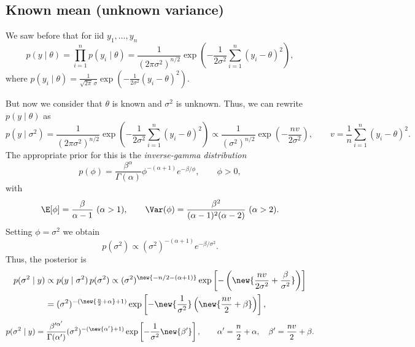 \subsection{Known mean (unknown variance)}
We saw before that for iid $y_1, \dots, y_n$
\[
p(y \mid \theta) = \prod_{i=1}^{n} p(y_i \mid \theta) = \frac{1}{(2\pi\sigma^2)^{n/2}}\exp\left(-\frac{1}{2\sigma^2}\sum_{i=1}^{n}(y_i - \theta)^2\right),
\]
where $p(y_i \mid \theta) = \frac{1}{\sqrt{2\pi}\,\sigma}\exp\left(-\frac{1}{2\sigma^2}(y_i - \theta)^2\right)$.

But now we consider that $\theta$ is known and $\sigma^2$ is unknown. Thus, we can rewrite $p(y \mid \theta)$ as
\[
p(y \mid \sigma^2) = \frac{1}{(2\pi\sigma^2)^{n/2}}\exp\left(-\frac{1}{2\sigma^2}\sum_{i=1}^{n}(y_i - \theta)^2\right)
\propto \frac{1}{(\sigma^2)^{n/2}}\exp\left(-\frac{nv}{2\sigma^2}\right),
\qquad
v = \frac1n\sum_{i=1}^{n}(y_i - \theta)^2.
\]
The appropriate prior for this is the \emph{inverse-gamma distribution}
\[
p(\phi) = \frac{\beta^\alpha}{\Gamma(\alpha)}\phi^{-(\alpha+1)}e^{-\beta/\phi}, \qquad \phi > 0,
\]
with
\[
\E[\phi] = \frac{\beta}{\alpha - 1}\ (\alpha > 1), \qquad \Var(\phi) = \frac{\beta^2}{(\alpha-1)^2(\alpha-2)}\ (\alpha > 2).
\]
Setting $\phi = \sigma^2$ we obtain
\[
p(\sigma^2) \propto (\sigma^2)^{-(\alpha+1)}e^{-\beta/\sigma^2}.
\]
Thus, the posterior is
\begin{align*}
p(\sigma^2 \mid y) &\propto p(y \mid \sigma^2)\,p(\sigma^2)
\propto (\sigma^2)^{\new{-n/2 - (\alpha+1)}}\exp\left[-\left(\new{\frac{nv}{2\sigma^2} + \frac{\beta}{\sigma^2}}\right)\right]\\
&= (\sigma^2)^{-(\new{\frac n2 + \alpha} + 1)}\exp\left[-\new{\frac{1}{\sigma^2}}\left(\new{\frac{nv}{2} + \beta}\right)\right],
\end{align*}
\[
p(\sigma^2 \mid y) = \frac{\beta'^{\alpha'}}{\Gamma(\alpha')}(\sigma^2)^{-(\new{\alpha'}+1)}\exp\left[-\frac{1}{\sigma^2}\new{\beta'}\right],
\qquad
\alpha' = \frac n2 + \alpha, \quad \beta' = \frac{nv}{2} + \beta.
\]

